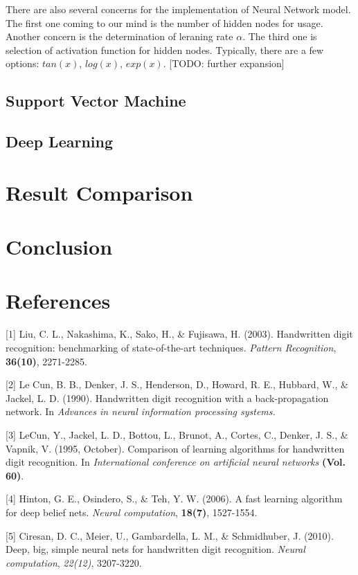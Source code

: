 \documentclass{article} %
\begin{document}
There are also several concerns for the implementation of Neural Network model.
The first one coming to our mind is the number of hidden nodes for usage.
Another concern is the determination of leraning rate $\alpha$. The third one
is selection of activation function for hidden nodes. Typically, there are a
few options: $tan(x)$, $log(x)$, $exp(x)$.
{\large [TODO: further expansion]}


\subsection{Support Vector Machine}


\subsection{Deep Learning}


\section{Result Comparison} \label{Comparison}

\section{Conclusion} \label{Conclu}

\section{References}

\small{
[1] Liu, C. L., Nakashima, K., Sako, H., \& Fujisawa, H. (2003). Handwritten
digit recognition: benchmarking of state-of-the-art techniques. {\it Pattern
    Recognition}, {\bf 36(10)}, 2271-2285.

[2] Le Cun, B. B., Denker, J. S., Henderson, D., Howard, R. E., Hubbard, W., \&
Jackel, L. D. (1990). Handwritten digit recognition with a back-propagation
network. In {\it Advances in neural information processing systems.}

[3] LeCun, Y., Jackel, L. D., Bottou, L., Brunot, A., Cortes, C., Denker, J.
S., \& Vapnik, V. (1995, October). Comparison of learning algorithms for
handwritten digit recognition. In {\it International conference on artificial
    neural networks} {\bf (Vol. 60)}.

[4] Hinton, G. E., Osindero, S., \& Teh, Y. W. (2006). A fast learning
algorithm for deep belief nets. {\it Neural computation}, {\bf 18(7)}, 1527-1554.

[5] Ciresan, D. C., Meier, U., Gambardella, L. M., \& Schmidhuber, J. (2010).
Deep, big, simple neural nets for handwritten digit recognition. {\it Neural
    computation}, {\it 22(12)}, 3207-3220.
}
\end{document}
